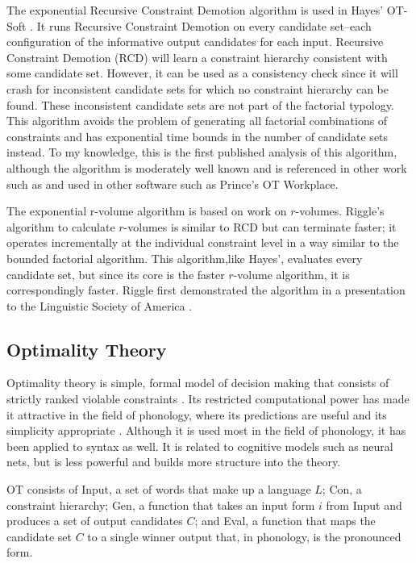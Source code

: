\documentclass[11pt]{article}
\begin{document}
The exponential Recursive Constraint Demotion algorithm is used in
Hayes' OT-Soft \cite{hayes03}. It runs Recursive Constraint Demotion
\cite{tesar93} on every candidate set--each configuration of the
informative output candidates for each input. Recursive Constraint
Demotion (RCD) will learn a constraint hierarchy consistent with some
candidate set. However, it can be used as a consistency check since it
will crash for inconsistent candidate sets for which no constraint
hierarchy can be found. These inconsistent candidate sets are not part
of the factorial typology.  This algorithm avoids the problem of
generating all factorial combinations of constraints and has
exponential time bounds in the number of candidate sets instead. To my
knowledge, this is the first published analysis of this algorithm,
although the algorithm is moderately well known and is referenced in
other work such as  and used in other software such
as Prince's OT Workplace.

The exponential r-volume algorithm is based on 
work on $r$-volumes. Riggle's algorithm to calculate $r$-volumes is
similar to RCD but can terminate faster; it operates incrementally at
the individual constraint level in a way similar to the bounded
factorial algorithm. This algorithm,like Hayes', evaluates every
candidate set, but since its core is the faster $r$-volume algorithm,
it is correspondingly faster. Riggle first demonstrated the algorithm
in a presentation to the Linguistic Society of America
\cite{riggle07}.

\subsection{Optimality Theory}
Optimality theory is simple, formal model of decision making that
consists of strictly ranked violable constraints \cite{prince93}. Its
restricted computational power has made it attractive in the field of
phonology, where its predictions are useful and its simplicity
appropriate \cite{moreton96}. Although it is used most in the field of
phonology, it has been applied to syntax as well. It is related to
cognitive models such as neural nets, but is less powerful and
builds more structure into the theory.

OT consists of {\sc Input}, a set of words that make up a language
$L$; {\sc Con}, a constraint hierarchy; {\sc Gen}, a function that
takes an input form $i$ from {\sc Input} and produces a set of output
candidates $C$; and {\sc Eval}, a function that maps the candidate set
$C$ to a single winner output that, in phonology, is the pronounced
form.
\end{document}
